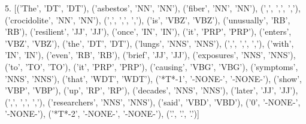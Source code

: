 \documentclass{article}
\begin{document}
5. [('The', 'DT', 'DT'), ('asbestos', 'NN', 'NN'), ('fiber', 'NN', 'NN'), (',', ',', ','), ('crocidolite', 'NN', 'NN'), (',', ',', ','), ('is', 'VBZ', 'VBZ'), ('unusually', 'RB', 'RB'), ('resilient', 'JJ', 'JJ'), ('once', 'IN', 'IN'), ('it', 'PRP', 'PRP'), ('enters', 'VBZ', 'VBZ'), ('the', 'DT', 'DT'), ('lungs', 'NNS', 'NNS'), (',', ',', ','), ('with', 'IN', 'IN'), ('even', 'RB', 'RB'), ('brief', 'JJ', 'JJ'), ('exposures', 'NNS', 'NNS'), ('to', 'TO', 'TO'), ('it', 'PRP', 'PRP'), ('causing', 'VBG', 'VBG'), ('symptoms', 'NNS', 'NNS'), ('that', 'WDT', 'WDT'), ('*T*-1', '-NONE-', '-NONE-'), ('show', 'VBP', 'VBP'), ('up', 'RP', 'RP'), ('decades', 'NNS', 'NNS'), ('later', 'JJ', 'JJ'), (',', ',', ','), ('researchers', 'NNS', 'NNS'), ('said', 'VBD', 'VBD'), ('0', '-NONE-', '-NONE-'), ('*T*-2', '-NONE-', '-NONE-'), ('.', '.', '.')]



\end{document}
